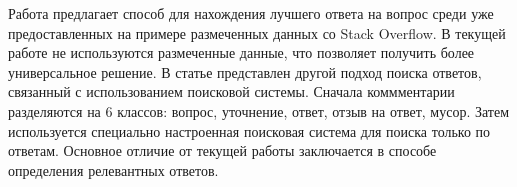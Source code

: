 Работа \cite{so} предлагает способ для нахождения лучшего ответа  на вопрос среди уже предоставленных на примере размеченных данных со Stack Overflow. В текущей работе не используются размеченные данные, что позволяет получить более универсальное решение. В статье \cite{engine} представлен другой подход поиска ответов, связанный с использованием поисковой системы. Сначала коммментарии разделяются на 6 классов: вопрос, уточнение, ответ, отзыв на ответ, мусор. Затем используется специально настроенная поисковая система для поиска только по ответам. Основное отличие от текущей работы заключается в способе определения релевантных ответов.
